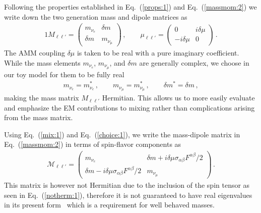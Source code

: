 \documentclass[addchapnum]{ws-rv961x669} %
\newcommand{\req}[1]{Eq.~(\ref{#1})}
\begin{document}
Following the properties established in \req{props:1} and \req{massmom:2} we write down the two generation mass and dipole matrices as
\begin{alignat}{1}
	\label{mix:1} M_{\ell\ell'}= 
	\begin{pmatrix}
		m_{\nu_{e}} & {\delta m}\\
		{\delta m} & m_{\nu_{\mu}}
	\end{pmatrix}\,,\qquad
	\mu_{\ell\ell'} = 
	\begin{pmatrix}
		0 & i\delta\mu\\
		-i\delta\mu & 0
	\end{pmatrix}\,.
\end{alignat}
The AMM coupling $\delta\mu$ is taken to be real with a pure imaginary coefficient. While the mass elements $m_{\nu_{e}}$, $m_{\nu_{\mu}}$, and ${\delta m}$ are generally complex, we choose in our toy model for them to be fully real
\begin{align}
    \label{choice:1}
    m_{\nu_{e}}=m_{\nu_{e}}^{*}\,,\qquad
    m_{\nu_{\mu}}=m_{\nu_{\mu}}^{*}\,,\qquad
    \delta m^{*}=\delta m\,,
\end{align}
making the mass matrix $M_{\ell\ell'}$ Hermitian. This allows us to more easily evaluate and emphasize the EM contributions to mixing rather than complications arising from the mass matrix.

Using \req{mix:1} and \req{choice:1}, we write the mass-dipole matrix in \req{massmom:2} in terms of spin-flavor components as
\begin{align}
	\label{mix:2}
    \mathcal{M}_{\ell\ell'} = 
	\begin{pmatrix}
		m_{\nu_{e}} & {\delta m}+i\delta\mu\sigma_{\alpha\beta}F^{\alpha\beta}/2\\
		{\delta m}-i\delta\mu\sigma_{\alpha\beta}F^{\alpha\beta}/2 & m_{\nu_{\mu}}
	\end{pmatrix}\,.
\end{align}
This matrix is however not Hermitian due to the inclusion of the spin tensor as seen in \req{notherm:1}, therefore it is not guaranteed to have real eigenvalues in its present form~\cite{arfken2011mathematical} which is a requirement for well behaved masses.
\end{document}
